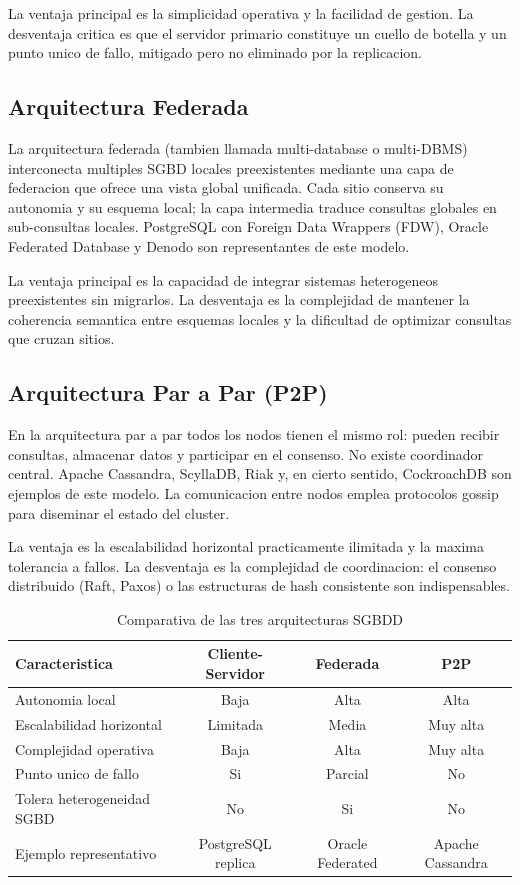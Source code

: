 \documentclass[11pt,a4paper]{article}
\begin{document}
La ventaja principal es la simplicidad operativa y la facilidad de gestion. La desventaja critica es que el servidor primario constituye un cuello de botella y un punto unico de fallo, mitigado pero no eliminado por la replicacion.

\subsection{Arquitectura Federada}

La arquitectura federada (tambien llamada multi-database o multi-DBMS) interconecta multiples SGBD locales preexistentes mediante una capa de federacion que ofrece una vista global unificada. Cada sitio conserva su autonomia y su esquema local; la capa intermedia traduce consultas globales en sub-consultas locales. PostgreSQL con Foreign Data Wrappers (FDW), Oracle Federated Database y Denodo son representantes de este modelo.

La ventaja principal es la capacidad de integrar sistemas heterogeneos preexistentes sin migrarlos. La desventaja es la complejidad de mantener la coherencia semantica entre esquemas locales y la dificultad de optimizar consultas que cruzan sitios.

\subsection{Arquitectura Par a Par (P2P)}

En la arquitectura par a par todos los nodos tienen el mismo rol: pueden recibir consultas, almacenar datos y participar en el consenso. No existe coordinador central. Apache Cassandra, ScyllaDB, Riak y, en cierto sentido, CockroachDB son ejemplos de este modelo. La comunicacion entre nodos emplea protocolos gossip para diseminar el estado del cluster.

La ventaja es la escalabilidad horizontal practicamente ilimitada y la maxima tolerancia a fallos. La desventaja es la complejidad de coordinacion: el consenso distribuido (Raft, Paxos) o las estructuras de hash consistente son indispensables.

\begin{table}[H]
\centering
\caption{Comparativa de las tres arquitecturas SGBDD}
\small
\begin{tabular}{lccc}
\toprule
\textbf{Caracteristica} & \textbf{Cliente-Servidor} & \textbf{Federada} & \textbf{P2P} \\
\midrule
Autonomia local & Baja & Alta & Alta \\
Escalabilidad horizontal & Limitada & Media & Muy alta \\
Complejidad operativa & Baja & Alta & Muy alta \\
Punto unico de fallo & Si & Parcial & No \\
Tolera heterogeneidad SGBD & No & Si & No \\
Ejemplo representativo & PostgreSQL replica & Oracle Federated & Apache Cassandra \\
\bottomrule
\end{tabular}
\label{tab:arquitecturas}
\end{table}
\end{document}
